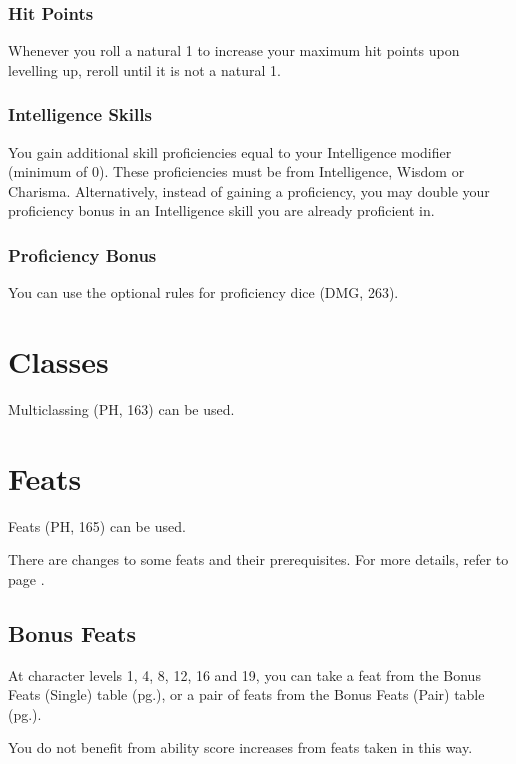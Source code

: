 \documentclass[House_Rules.tex]{subfiles}
\begin{document}
\subsubsection{Hit Points}
Whenever you roll a natural 1 to increase your maximum hit points upon levelling up, reroll until it is not a natural 1.

\subsubsection{Intelligence Skills}
You gain additional skill proficiencies equal to your Intelligence modifier (minimum of 0). These proficiencies must be from Intelligence, Wisdom or Charisma. Alternatively, instead of gaining a proficiency, you may double your proficiency bonus in an Intelligence skill you are already proficient in.

\subsubsection{Proficiency Bonus}
You can use the optional rules for proficiency dice (DMG, 263).


\section{Classes}
Multiclassing (PH, 163) can be used.




\section{Feats}
Feats (PH, 165) can be used.

There are changes to some feats and their prerequisites. For more details, refer to page \pageref{B-feats}.

\subsection{Bonus Feats}
At character levels 1, 4, 8, 12, 16 and 19, you can take a feat from the Bonus Feats (Single) table (pg.\pageref{bonusFeatsSingleTable}), or a pair of feats from the Bonus Feats (Pair) table (pg.\pageref{bonusFeatsPairTable}). 

You do not benefit from ability score increases from feats taken in this way.
\end{document}
